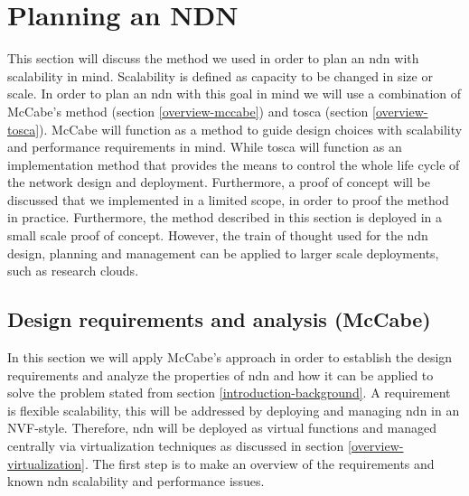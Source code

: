 \section{Planning an NDN}
\label{planning-ndn}
This section will discuss the method we used in order to plan an \gls{ndn} with scalability in mind. Scalability is defined as capacity to be changed in size or scale. In order to plan an \gls{ndn} with this goal in mind we will use a combination of McCabe's method (section \ref{overview-mccabe}) and \gls{tosca} (section \ref{overview-tosca}). McCabe will function as a method to guide design choices with scalability and performance requirements in mind. While \gls{tosca} will function as an implementation method that provides the means to control the whole life cycle of the network design and deployment. Furthermore, a proof of concept will be discussed that we implemented in a limited scope, in order to proof the method in practice. Furthermore, the method described in this section is deployed in a small scale proof of concept. However, the train of thought used for the \gls{ndn} design, planning and management can be applied to larger scale deployments, such as research clouds.

\subsection{Design requirements and analysis (McCabe)}
\label{planning-requirements}
In this section we will apply McCabe's approach in order to establish the design requirements and analyze the properties of \gls{ndn} and how it can be applied to solve the problem stated from section \ref{introduction-background}. A requirement is flexible scalability, this will be addressed by deploying and managing \gls{ndn} in an NVF-style. Therefore, \gls{ndn} will be deployed as virtual functions and managed centrally via virtualization techniques as discussed in section \ref{overview-virtualization}. The first step is to make an overview of the requirements and known \gls{ndn} scalability and performance issues.

